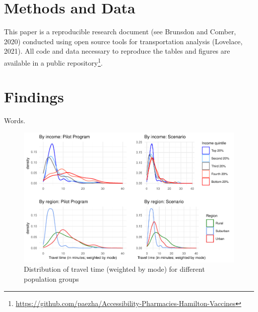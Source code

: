 \documentclass[]{elsarticle} %
\begin{document}
\hypertarget{methods-and-data}{%
\section{Methods and Data}\label{methods-and-data}}

This paper is a reproducible research document (see Brunsdon and Comber,
2020) conducted using open source tools for transportation analysis
(Lovelace, 2021). All code and data necessary to reproduce the tables
and figures are available in a public
repository\footnote{\url{https://github.com/paezha/Accessibility-Pharmacies-Hamilton-Vaccines}}.

\hypertarget{findings}{%
\section{Findings}\label{findings}}

Words.

\begin{figure}

{\centering \includegraphics{Accessibility-Vaccination-Sites-Hamilton_files/figure-latex/figure-results-1} 

}

\caption{\label{fig:results}Distribution of travel time (weighted by mode) for different population groups}\label{fig:figure-results}
\end{figure}
\end{document}
